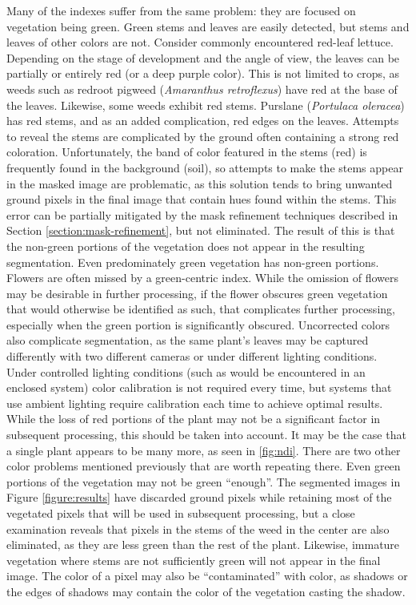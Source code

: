 \documentclass[letterpaper, notitlepage]{report}
\begin{document}
{\label{section:problems-color}
Many of the indexes suffer from the same problem: they are focused on vegetation being green. Green stems and leaves are easily detected, but stems and leaves of other colors are not. Consider commonly encountered red-leaf lettuce. Depending on the stage of development and the angle of view, the leaves can be partially or entirely red (or a deep purple color). This is not limited to crops, as weeds such as redroot pigweed (\textit{Amaranthus retroflexus}) have red at the base of the leaves. Likewise, some weeds exhibit red stems. Purslane (\textit{Portulaca oleracea}) has red stems, and as an added complication, red edges on the leaves. Attempts to reveal the stems are complicated by the ground often containing a strong red coloration. Unfortunately, the band of color featured in the stems (red) is frequently found in the background (soil), so attempts to make the stems appear in the masked image are problematic, as this solution tends to bring unwanted ground pixels in the final image that contain hues found within the stems. This error can be partially mitigated by the mask refinement techniques described in Section \ref{section:mask-refinement}, but not eliminated. The result of this is that the non-green portions of the vegetation does not appear in the resulting segmentation.  Even predominately green vegetation has non-green portions. Flowers are often missed by a green-centric index. While the omission of flowers may be desirable in further processing, if the flower obscures green vegetation that would otherwise be identified as such, that complicates further processing, especially when the green portion is significantly obscured. Uncorrected colors also complicate segmentation, as the same plant's leaves may be captured differently with two different cameras or under different lighting conditions. Under controlled lighting conditions (such as would be encountered in an enclosed system) color calibration is not required every time, but systems that use ambient lighting require calibration each time to achieve optimal results. While the loss of red portions of the plant may not be a significant factor in subsequent processing, this should be taken into account. It may be the case that a single plant appears to be many more, as seen in \ref{fig:ndi}.
There are two other color problems mentioned previously that are worth repeating there. Even green portions of the vegetation may not be green ``enough''. The segmented images in Figure \ref{figure:results} have discarded ground pixels while retaining most of the vegetated pixels that will be used in subsequent processing, but a close examination reveals that pixels in the stems of the weed in the center are also eliminated, as they are less green than the rest of the plant. Likewise, immature vegetation where stems are not sufficiently green will not appear in the final image. The color of a pixel may also be ``contaminated'' with color, as shadows or the edges of shadows may contain the color of the vegetation casting the shadow.
}
\end{document}
